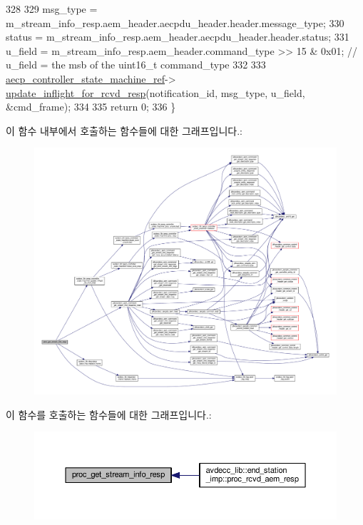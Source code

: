 \begin{DoxyCode}
328 
329     msg\_type = m\_stream\_info\_resp.aem\_header.aecpdu\_header.header.message\_type;
330     status = m\_stream\_info\_resp.aem\_header.aecpdu\_header.header.status;
331     u\_field = m\_stream\_info\_resp.aem\_header.command\_type >> 15 & 0x01; \textcolor{comment}{// u\_field = the msb of the uint16\_t
       command\_type}
332 
333     \hyperlink{namespaceavdecc__lib_a0b1b5aea3c0490f77cbfd9178af5be22}{aecp\_controller\_state\_machine\_ref}->
      \hyperlink{classavdecc__lib_1_1aecp__controller__state__machine_a997abd9786c330a5505e903e6443208e}{update\_inflight\_for\_rcvd\_resp}(notification\_id, msg\_type, u\_field, &cmd\_frame);
334 
335     \textcolor{keywordflow}{return} 0;
336 \}
\end{DoxyCode}


이 함수 내부에서 호출하는 함수들에 대한 그래프입니다.\+:
\nopagebreak
\begin{figure}[H]
\begin{center}
\leavevmode
\includegraphics[width=350pt]{classavdecc__lib_1_1stream__input__descriptor__imp_a7295ef0aaf778e1d94aa5b8150104a3e_cgraph}
\end{center}
\end{figure}




이 함수를 호출하는 함수들에 대한 그래프입니다.\+:
\nopagebreak
\begin{figure}[H]
\begin{center}
\leavevmode
\includegraphics[width=350pt]{classavdecc__lib_1_1stream__input__descriptor__imp_a7295ef0aaf778e1d94aa5b8150104a3e_icgraph}
\end{center}
\end{figure}



